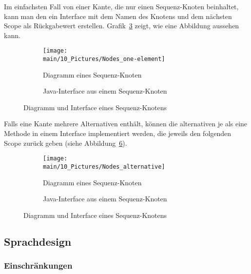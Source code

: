 \documentclass[../InterneDSLs.tex]{subfiles}
\begin{document}
Im einfachsten Fall von einer Kante, die nur einen Sequenz-Knoten beinhaltet, kann man den ein Interface mit dem Namen des Knotens und dem nächsten Scope als Rückgabewert erstellen. Grafik~\ref{FIG:SequenceNode} zeigt, wie eine Abbildung aussehen kann.
\begin{figure}[ht]
\centering
  \begin{subfigure}[b]{0.49\textwidth}
    \texttt{[image: \\main/10\_Pictures/Nodes\_one-element]}
    \caption{Diagramm eines Sequenz-Knoten}
    \label{FIG:DiagramSequenceNode}
  \end{subfigure}
  \begin{subfigure}[b]{0.49\textwidth}
    
    \caption{Java-Interface aus einem Sequenz-Knoten}
    \label{FIG:JInterfaceSequenceNode}
  \end{subfigure}
  \caption{Diagramm und Interface eines Sequenz-Knotens}
  \label{FIG:SequenceNode}
\end{figure}

Falls eine Kante mehrere Alternativen enthält, können die alternativen je als eine Methode in einem Interface implementiert werden, die jeweils den folgenden Scope zurück geben (siehe Abbildung~\ref{FIG:AlternativeNode}).
\begin{figure}[ht]
\centering
  \begin{subfigure}[b]{0.49\textwidth}
    \texttt{[image: \\main/10\_Pictures/Nodes\_alternative]}
    \caption{Diagramm eines Sequenz-Knoten}
    \label{FIG:DiagramAlternativeNode}
  \end{subfigure}
  \begin{subfigure}[b]{0.49\textwidth}
    
    \caption{Java-Interface aus einem Sequenz-Knoten}
    \label{FIG:JInterfaceAlternativeNode}
  \end{subfigure}
  \caption{Diagramm und Interface eines Sequenz-Knotens}
  \label{FIG:AlternativeNode}
\end{figure}


\subsection{Sprachdesign}


\subsubsection{Einschränkungen}
\end{document}
